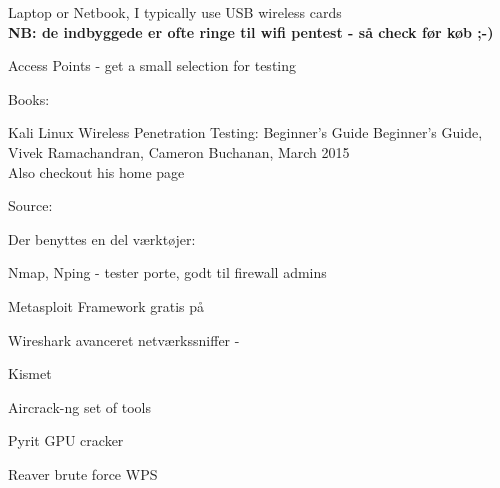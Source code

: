 \documentclass[Screen16to9,17pt]{foils}
\begin{document}


\begin{list1}
\item Laptop or Netbook, I typically use USB wireless cards\\
{\bf NB: de indbyggede er ofte ringe til wifi pentest - så check før køb ;-)}
\item Access Points - get a small selection for testing
\item Books:
\begin{list2}
\item
Kali Linux Wireless Penetration Testing: Beginner's Guide
Beginner's Guide, Vivek Ramachandran, Cameron Buchanan, March 2015\\
Also checkout his home page 
\end{list2}
\end{list1}



Source: 



\begin{list1}
\item Der benyttes en del værktøjer:
\begin{list2}
\item Nmap, Nping - tester porte, godt til firewall admins 
\item Metasploit Framework gratis på 
\item Wireshark avanceret netværkssniffer - 
\item Kismet 
\item Aircrack-ng set of tools 
\item Pyrit GPU cracker 
\item Reaver brute force WPS 
\end{list2}
\end{list1}
\end{document}
